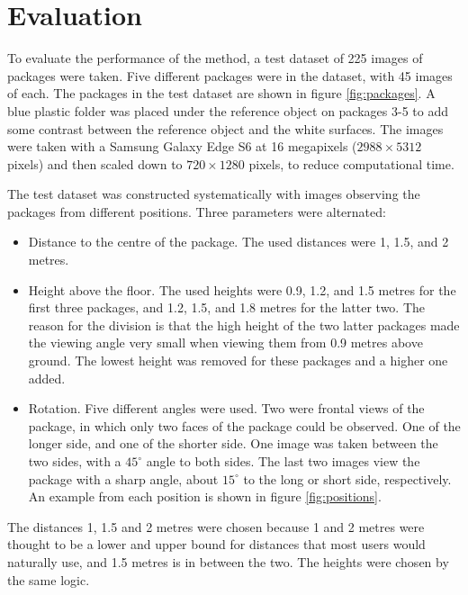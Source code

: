 \section{Evaluation} \label{method:evaluation}
To evaluate the performance of the method, a test dataset of 225 images of packages were taken.
Five different packages were in the dataset, with 45 images of each.
The packages in the test dataset are shown in figure \ref{fig:packages}. A blue plastic folder was placed under the reference object on packages 3-5 to add some contrast between the reference object and the white surfaces.
The images were taken with a Samsung Galaxy Edge S6 at 16 megapixels ($2988 \times 5312$ pixels) and then scaled down to $720 \times 1280$ pixels, to reduce computational time. %


The test dataset was constructed systematically with images observing the packages from different positions.
Three parameters were alternated: 
\begin{itemize}
	\item Distance to the centre of the package. 
			The used distances were 1, 1.5, and 2 metres.
	\item Height above the floor. 
			The used heights were 0.9, 1.2, and 1.5 metres for the first three packages, and 1.2, 1.5, and 1.8 metres for the latter two.
			The reason for the division is that the high height of the two latter packages made the viewing angle very small when viewing them from 0.9 metres above ground. The lowest height was removed for these packages and a higher one added.
	\item Rotation. 
			Five different angles were used.
			Two were frontal views of the package, in which only two faces of the package could be observed. One of the longer side, and one of the shorter side.
			One image was taken between the two sides, with a $45^\circ$ angle to both sides.
			The last two images view the package with a sharp angle, about $15^\circ$ to the long or short side, respectively.
			An example from each position is shown in figure \ref{fig:positions}.
\end{itemize}

The distances 1, 1.5 and 2 metres were chosen because 1 and 2 metres were thought to be a lower and upper bound for distances that most users would naturally use, and 1.5 metres is in between the two.
The heights were chosen by the same logic.



